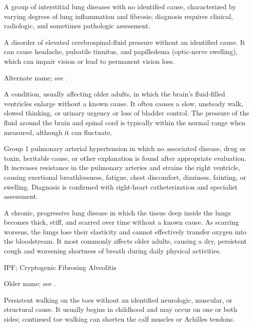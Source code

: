  A group of interstitial lung diseases with no identified cause, characterized by varying degrees of lung inflammation and fibrosis; diagnosis requires clinical, radiologic, and sometimes pathologic assessment.

 A disorder of elevated cerebrospinal-fluid pressure without an identified cause. It can cause headache, pulsatile tinnitus, and papilledema (optic-nerve swelling), which can impair vision or lead to permanent vision loss.

 Alternate name; see .

 A condition, usually affecting older adults, in which the brain’s fluid-filled ventricles enlarge without a known cause. It often causes a slow, unsteady walk, slowed thinking, or urinary urgency or loss of bladder control. The pressure of the fluid around the brain and spinal cord is typically within the normal range when measured, although it can fluctuate.

 Group 1 pulmonary arterial hypertension in which no associated disease, drug or toxin, heritable cause, or other explanation is found after appropriate evaluation. It increases resistance in the pulmonary arteries and strains the right ventricle, causing exertional breathlessness, fatigue, chest discomfort, dizziness, fainting, or swelling. Diagnosis is confirmed with right-heart catheterization and specialist assessment.

 A chronic, progressive lung disease in which the tissue deep inside the lungs becomes thick, stiff, and scarred over time without a known cause. As scarring worsens, the lungs lose their elasticity and cannot effectively transfer oxygen into the bloodstream. It most commonly affects older adults, causing a dry, persistent cough and worsening shortness of breath during daily physical activities.

\synonyms
IPF; Cryptogenic Fibrosing Alveolitis

 Older name; see .

 Persistent walking on the toes without an identified neurologic, muscular, or structural cause. It usually begins in childhood and may occur on one or both sides; continued toe walking can shorten the calf muscles or Achilles tendons.

